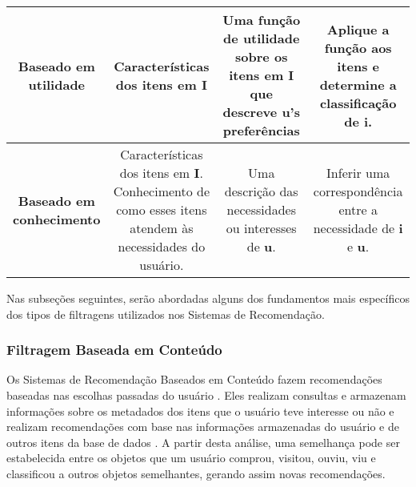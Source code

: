 \begin{table}[]
\begin{tabular}{|c|c|c|c|}
	\rowcolor[HTML]{EFEFEF} 
	\textbf{Baseado em utilidade} & \begin{minipage} [t] {0.2\textwidth} \centering Características dos itens em \textbf{I} \end{minipage}  & \begin{minipage} [t] {0.2\textwidth} 
		Uma função de utilidade sobre os itens em \textbf{I} que descreve \textbf{u}'s preferências \end{minipage}   & \begin{minipage} [t] {0.2\textwidth} Aplique a função aos itens e determine a classificação de \textbf{i}.  \end{minipage}  \\ \hline
	\textbf{Baseado em conhecimento}  & \begin{minipage} [t] {0.2\textwidth} \centering Características dos itens em \textbf{I}. Conhecimento de como esses itens atendem às necessidades do usuário.  \end{minipage}  & \begin{minipage} [t] {0.2\textwidth} Uma descrição das necessidades ou interesses de \textbf{u}.\end{minipage}  &  \begin{minipage} [t] {0.2\textwidth}  
		Inferir uma correspondência entre a necessidade de \textbf{i} e \textbf{u}. \end{minipage} \\ \hline
	\end{tabular}
\end{table}



Nas subseções seguintes, serão abordadas alguns dos fundamentos mais específicos dos tipos de filtragens utilizados nos Sistemas de Recomendação.




\subsubsection{Filtragem Baseada em Conteúdo}


Os Sistemas de Recomendação Baseados em Conteúdo fazem recomendações baseadas nas escolhas passadas do usuário \cite{bobadilla2013}. 
Eles realizam consultas e armazenam informações sobre os metadados dos itens que o usuário teve interesse ou não e realizam recomendações 
com base nas informações armazenadas do usuário e de outros itens da base de dados \cite{mauricio}. A partir desta análise, uma semelhança pode ser
estabelecida entre os objetos que um usuário comprou, visitou, ouviu, viu e classificou a outros objetos semelhantes, gerando assim novas recomendações. 

